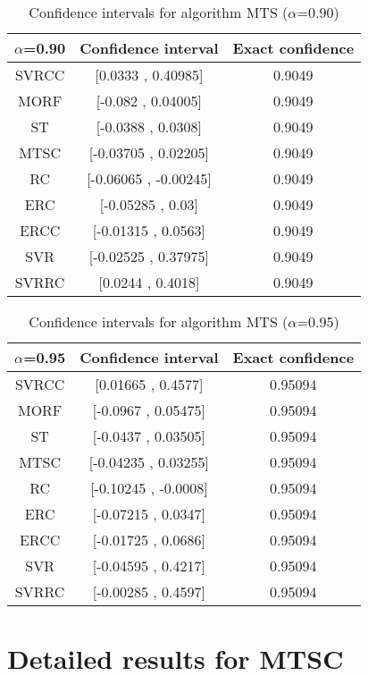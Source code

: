 \documentclass[a4paper,10pt]{article}
\begin{document}
\begin{table}[!htp]
\centering\small
\begin{tabular}{
|c|c|c|}
\hline
 $\alpha$=0.90 & Confidence interval & Exact confidence \\ \hline 
SVRCC & [0.0333 , 0.40985] & 0.9049\\ \hline 
MORF & [-0.082 , 0.04005] & 0.9049\\ \hline 
ST & [-0.0388 , 0.0308] & 0.9049\\ \hline 
MTSC & [-0.03705 , 0.02205] & 0.9049\\ \hline 
RC & [-0.06065 , -0.00245] & 0.9049\\ \hline 
ERC & [-0.05285 , 0.03] & 0.9049\\ \hline 
ERCC & [-0.01315 , 0.0563] & 0.9049\\ \hline 
SVR & [-0.02525 , 0.37975] & 0.9049\\ \hline 
SVRRC & [0.0244 , 0.4018] & 0.9049\\ \hline 

\end{tabular}
\caption{Confidence intervals for algorithm MTS ($\alpha$=0.90)}
\end{table}
\begin{table}[!htp]
\centering\small
\begin{tabular}{
|c|c|c|}
\hline
 $\alpha$=0.95 & Confidence interval & Exact confidence \\ \hline 
SVRCC & [0.01665 , 0.4577] & 0.95094\\ \hline 
MORF & [-0.0967 , 0.05475] & 0.95094\\ \hline 
ST & [-0.0437 , 0.03505] & 0.95094\\ \hline 
MTSC & [-0.04235 , 0.03255] & 0.95094\\ \hline 
RC & [-0.10245 , -0.0008] & 0.95094\\ \hline 
ERC & [-0.07215 , 0.0347] & 0.95094\\ \hline 
ERCC & [-0.01725 , 0.0686] & 0.95094\\ \hline 
SVR & [-0.04595 , 0.4217] & 0.95094\\ \hline 
SVRRC & [-0.00285 , 0.4597] & 0.95094\\ \hline 

\end{tabular}
\caption{Confidence intervals for algorithm MTS ($\alpha$=0.95)}
\end{table}

 \clearpage 


\section{Detailed results for MTSC}
\end{document}
